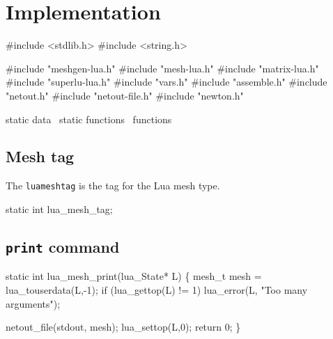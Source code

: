 \section{Implementation}

\nwenddocs{}\endmoddef
#include <stdlib.h>
#include <string.h>

#include "meshgen-lua.h"
#include "mesh-lua.h"
#include "matrix-lua.h"
#include "superlu-lua.h"
#include "vars.h"
#include "assemble.h"
#include "netout.h"
#include "netout-file.h"
#include "newton.h"

\LA{}static data~{\nwtagstyle{}}\RA{}
\LA{}static functions~{\nwtagstyle{}}\RA{}
\LA{}functions~{\nwtagstyle{}}\RA{}
\nwendcode{}\nwdocspar


\subsection{Mesh tag}

The {\tt{}lua{}mesh{}tag} is the tag for the Lua mesh type.

\nwenddocs{}\endmoddef
static int lua_mesh_tag;

\nwendcode{}\nwdocspar


\subsection{{\tt{}print} command}

\nwenddocs{}\endmoddef
static int lua_mesh_print(lua_State* L)
\{
    mesh_t mesh = lua_touserdata(L,-1);
    if (lua_gettop(L) != 1)
        lua_error(L, "Too many arguments");

    netout_file(stdout, mesh);
    lua_settop(L,0);
    return 0;
\}

\nwendcode{}\nwdocspar


